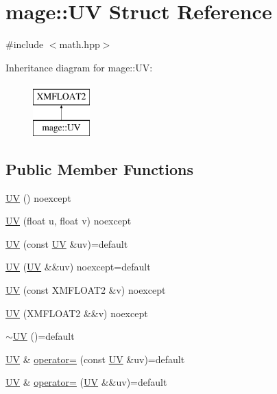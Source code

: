 \hypertarget{structmage_1_1_u_v}{}\section{mage\+:\+:UV Struct Reference}
\label{structmage_1_1_u_v}


{\ttfamily \#include $<$math.\+hpp$>$}

Inheritance diagram for mage\+:\+:UV\+:\begin{figure}[H]
\begin{center}
\leavevmode
\includegraphics[height=2.000000cm]{structmage_1_1_u_v}
\end{center}
\end{figure}
\subsection*{Public Member Functions}
\begin{DoxyCompactItemize}
\item 
\hyperlink{structmage_1_1_u_v_a2b7b6f75876aab6a932cb283942eec99}{UV} () noexcept
\item 
\hyperlink{structmage_1_1_u_v_a093a3bed0b565a8e9669409060a71faf}{UV} (float u, float v) noexcept
\item 
\hyperlink{structmage_1_1_u_v_a6ae26e6be3db3b2b2fb7e6b8df76fc24}{UV} (const \hyperlink{structmage_1_1_u_v}{UV} \&uv)=default
\item 
\hyperlink{structmage_1_1_u_v_a47ad5c6b2fa30ef9a91bc875d71131b0}{UV} (\hyperlink{structmage_1_1_u_v}{UV} \&\&uv) noexcept=default
\item 
\hyperlink{structmage_1_1_u_v_a20ccaa4ee48cf6a9d072295f62461f7d}{UV} (const X\+M\+F\+L\+O\+A\+T2 \&v) noexcept
\item 
\hyperlink{structmage_1_1_u_v_a7a1800a0330d2ae8705418543fed6465}{UV} (X\+M\+F\+L\+O\+A\+T2 \&\&v) noexcept
\item 
\hyperlink{structmage_1_1_u_v_a9389be8cc9bb64861b69f79b44b6dd1b}{$\sim$\+UV} ()=default
\item 
\hyperlink{structmage_1_1_u_v}{UV} \& \hyperlink{structmage_1_1_u_v_a3ef9497749cc5a99285b110d3f5a59aa}{operator=} (const \hyperlink{structmage_1_1_u_v}{UV} \&uv)=default
\item 
\hyperlink{structmage_1_1_u_v}{UV} \& \hyperlink{structmage_1_1_u_v_ab3a52afacb7c0b6e8f702888f66847f9}{operator=} (\hyperlink{structmage_1_1_u_v}{UV} \&\&uv)=default
\end{DoxyCompactItemize}


